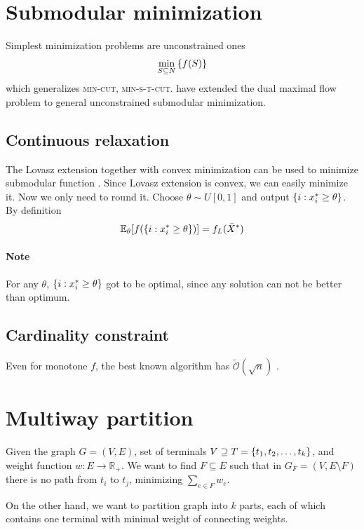 \section{Submodular minimization}
Simplest minimization problems are unconstrained ones
\begin{align}
\min\limits_{S\subseteq N} \qty{f(S)}
\end{align}
which generalizes \textsc{min-cut}, \textsc{min-s-t-cut}. \citet{iwata2001combinatorial} have extended the dual maximal flow problem to general unconstrained submodular minimization.

\subsection{Continuous relaxation}
The Lovasz extension together with convex minimization can be used to minimize submodular function \cite{grotschel1981ellipsoid}. Since Lovasz extension is convex, we can easily minimize it. Now we only need to round it. Choose $\theta \sim U[0,1]$ and output $\qty{i: x^*_i \geq \theta}$. By definition
\begin{align}
\mathbb{E}_\theta \qty[f\qty(\qty{i: x^*_i \geq \theta})] = f_L(\bar{X}^*)
\end{align}
\paragraph{Note}
For any $\theta$, $\qty{i: x^*_i \geq \theta}$ got to be optimal, since any solution can not be better than optimum.
\subsection{Cardinality constraint}
Even for monotone $f$, the best known algorithm has $\tilde{\mathcal{O}}(\sqrt{n})$ \cite{svitkina2011submodular}.

\section{Multiway partition}
Given  the graph $G=(V,E)$, set of terminals $V\supseteq T = \qty{t_1, t_2, \dots, t_k}$, and weight function $w: E\to \mathbb{R}_+$. We want to find $F\subseteq E$ such that in $G_F = (V, E\setminus F)$ there is no path from $t_i$ to $t_j$, minimizing $\sum_{e\in F} w_e$.

On the other hand, we want to partition graph into $k$ parts, each of which contains one terminal with minimal weight of connecting weights.


